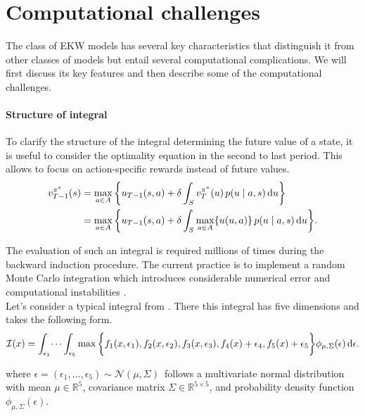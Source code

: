 \section{Computational challenges}\label{Computation}
The class of EKW models has several key characteristics that distinguish it from other classes of models but entail several computational complications. We will first discuss its key features and then describe some of the computational challenges.





\paragraph{Structure of integral}

To clarify the structure of the integral determining the future value of a state, it is useful to consider the optimality equation in the second to last period. This allows to focus on action-specific rewards instead of future values.
%
\begin{align}
v^{\pi^*}_{T-1}(s) & = \max_{a \in A}\bigg\{ u_{T-1}(s, a) + \delta \int_S v^{\pi^*}_{T}(u)\, p(u\mid a, s) \mathop{}\!\mathrm{d} u\bigg\}\\
& = \max_{a \in A}\bigg\{ u_{T-1}(s, a) + \delta \int_S \max_{a \in A}\{u(u, a)\}\, p(u\mid a, s) \mathop{}\!\mathrm{d} u\bigg\}.
\end{align}

The evaluation of such an integral is required millions of times during the backward induction procedure. The current practice is to implement a random Monte Carlo integration which introduces considerable numerical error and computational instabilities \citep{Judd.2011}.\\

Let's consider a typical integral from \citet{Keane.1997}. There this integral has five dimensions and takes the following form.
%
\begin{align*}
\mathcal{I}(x) = \int_{\epsilon_1} \dots \int_{\epsilon_5} \max \bigg\{ f_1(x, \epsilon_1), f_2(x, \epsilon_2), f_3(x, \epsilon_3), f_{4}(x) + \epsilon_{4}, f_{5}(x) + \epsilon_{5}\bigg\} \phi_{\mu, \Sigma}(\epsilon) \mathop{}\!\mathrm{d}\epsilon.
\end{align*}

where $\epsilon = (\epsilon_1, \dots, \epsilon_5) \sim \mathcal{N}(\mu, \Sigma)\,$ follows a multivariate normal distribution with mean $\mu \in \mathbb{R}^{5}$, covariance matrix $ \Sigma \in \mathbb{R}^{5 \times 5}$, and probability density function $\phi_{\mu, \Sigma}(\epsilon)$.

